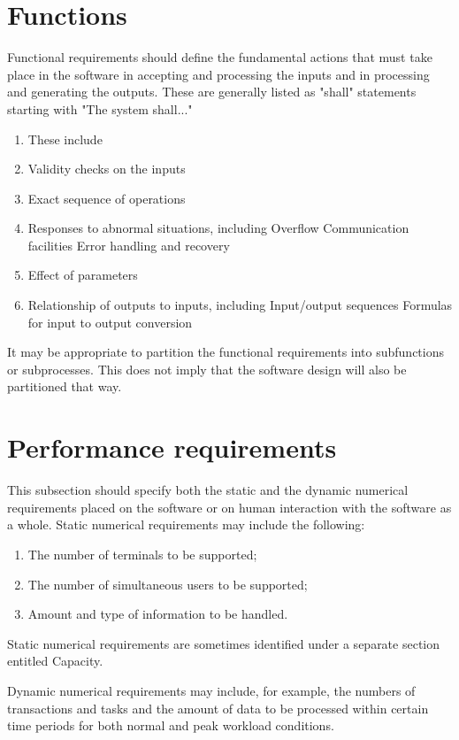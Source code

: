 \documentclass{scrreprt}
\begin{document}
\section{Functions}
Functional requirements should define the fundamental actions that must take
place in the software in accepting and processing the inputs and in processing
and generating the outputs. These are generally listed as "shall" statements
starting with "The system shall..."

\begin{enumerate}
	\item These include
	\item Validity checks on the inputs
	\item Exact sequence of operations
	\item Responses to abnormal situations, including
		\subitem Overflow
		\subitem Communication facilities
		\subitem Error handling and recovery
	\item Effect of parameters
	\item Relationship of outputs to inputs, including
		\subitem Input/output sequences
		\subitem Formulas for input to output conversion
\end{enumerate}


It may be appropriate to partition the functional requirements into subfunctions
or subprocesses. This does not imply that the software design will also be
partitioned that way.

\section{Performance requirements}
This subsection should specify both the static and the dynamic numerical
requirements placed on the software or on human interaction with the software as
a whole. Static numerical requirements may include the following:

\begin{enumerate}
	\item The number of terminals to be supported;
	\item The number of simultaneous users to be supported;
	\item Amount and type of information to be handled.
\end{enumerate}

Static numerical requirements are sometimes identified under a separate section
entitled Capacity.

Dynamic numerical requirements may include, for example, the numbers of
transactions and tasks and the amount of data to be processed within certain
time periods for both normal and peak workload conditions.
\end{document}
